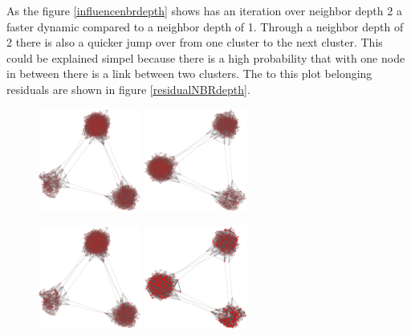 As the figure \ref{influencenbrdepth} shows has an iteration over neighbor depth 2 a faster dynamic compared to a neighbor depth of 1. Through a neighbor depth of 2 there is also a quicker jump over from one cluster to the next cluster. This could be explained simpel because there is a high probability that with one node in between there is a link between two clusters. The to this plot belonging residuals are shown in figure \ref{residualNBRdepth}.

\begin{figure}
\centering
\includegraphics[width=0.3\textwidth]{batchRun__kHalf=6-6-6_maxUpdate=0.02_noize=0_nbrDepth=1/network0-crop.pdf}
\hskip2cm
\includegraphics[width=0.3\textwidth]{batchRun__kHalf=6-6-6_maxUpdate=0.02_noize=0_nbrDepth=2/network0-crop.pdf}

\includegraphics[width=0.3\textwidth]{batchRun__kHalf=6-6-6_maxUpdate=0.02_noize=0_nbrDepth=1/network250-crop.pdf}
\hskip2cm
\includegraphics[width=0.3\textwidth]{batchRun__kHalf=6-6-6_maxUpdate=0.02_noize=0_nbrDepth=2/network250-crop.pdf}


\end{figure}
